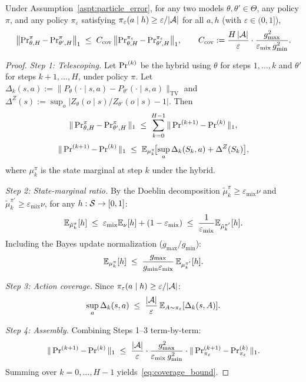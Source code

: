 \begin{lem}\label{lem:coverage}
Under Assumption~\ref{aspt:particle_error}, for any two models $\theta,\theta'\in\Theta$, any policy $\pi$, and any policy $\pi_\varepsilon$ satisfying $\pi_\varepsilon(a\mid h)\ge\varepsilon/|{\mathcal{A}}|$ for all $a,h$ (with $\varepsilon\in(0,1]$),
\begin{equation}\label{eq:coverage_bound}
\bigl\|\operatorname{Pr}_{\theta,H}^\pi-\operatorname{Pr}_{\theta',H}^\pi\bigr\|_1
\;\le\;
C_{\mathrm{cov}}\,
\bigl\|\operatorname{Pr}_{\theta,H}^{\pi_\varepsilon}-\operatorname{Pr}_{\theta',H}^{\pi_\varepsilon}\bigr\|_1,
\qquad
C_{\mathrm{cov}}:=\frac{H\,|{\mathcal{A}}|}{\varepsilon}\cdot\frac{g_{\max}^2}{\varepsilon_{\mathrm{mix}}\,g_{\min}^2}.
\end{equation}
\end{lem}

\begin{proof}
\emph{Step 1: Telescoping.}
Let $\operatorname{Pr}^{(k)}$ be the hybrid using $\theta$ for steps $1,\ldots,k$ and $\theta'$ for steps $k+1,\ldots,H$, under policy $\pi$. Let $\Delta_k(s,a):=\|P_\theta(\cdot\mid s,a)-P_{\theta'}(\cdot\mid s,a)\|_{\mathrm{TV}}$ and $\Delta^Z(s):=\sup_o|Z_\theta(o\mid s)/Z_{\theta'}(o\mid s)-1|$. Then
\begin{equation}\label{eq:telescope}
\|\operatorname{Pr}_{\theta,H}^\pi-\operatorname{Pr}_{\theta',H}^\pi\|_1
\;\le\;
\sum_{k=0}^{H-1}\|\operatorname{Pr}^{(k+1)}-\operatorname{Pr}^{(k)}\|_1,
\end{equation}
\begin{equation}\label{eq:per_step_bound}
\|\operatorname{Pr}^{(k+1)}-\operatorname{Pr}^{(k)}\|_1
\;\le\;
\mathbb{E}_{\mu_k^\pi}\!\bigl[\sup_{a}\Delta_k(S_k,a)+\Delta^Z(S_k)\bigr],
\end{equation}
where $\mu_k^\pi$ is the state marginal at step $k$ under the hybrid.

\emph{Step 2: State-marginal ratio.}
By the Doeblin decomposition $\tilde\mu_k^\pi \ge \varepsilon_{\mathrm{mix}}\nu$ and $\tilde\mu_k^{\pi'}\ge\varepsilon_{\mathrm{mix}}\nu$, for any $h:{\mathcal{S}}\to[0,1]$:
\[
\mathbb{E}_{\tilde\mu_k^\pi}[h]
\;\le\; \varepsilon_{\mathrm{mix}}\mathbb{E}_\nu[h] + (1-\varepsilon_{\mathrm{mix}})
\;\le\; \frac{1}{\varepsilon_{\mathrm{mix}}}\mathbb{E}_{\tilde\mu_k^{\pi'}}[h].
\]
Including the Bayes update normalization ($g_{\max}/g_{\min}$):
\[
\mathbb{E}_{\mu_k^\pi}[h]\;\le\; \frac{g_{\max}}{g_{\min}\varepsilon_{\mathrm{mix}}}\,\mathbb{E}_{\mu_k^{\pi'}}[h].
\]

\emph{Step 3: Action coverage.}
Since $\pi_\varepsilon(a\mid h)\ge\varepsilon/|{\mathcal{A}}|$:
\[
\sup_{a}\Delta_k(s,a)
\;\le\;
\frac{|{\mathcal{A}}|}{\varepsilon}\,\mathbb{E}_{A\sim\pi_\varepsilon}[\Delta_k(s,A)].
\]

\emph{Step 4: Assembly.}
Combining Steps 1--3 term-by-term:
\[
\|\operatorname{Pr}^{(k+1)}-\operatorname{Pr}^{(k)}\|_1
\;\le\;
\frac{|{\mathcal{A}}|}{\varepsilon}\cdot\frac{g_{\max}^2}{\varepsilon_{\mathrm{mix}}\,g_{\min}^2}\cdot\|\operatorname{Pr}^{(k+1)}_{\pi_\varepsilon}-\operatorname{Pr}^{(k)}_{\pi_\varepsilon}\|_1.
\]
Summing over $k=0,\ldots,H-1$ yields~\eqref{eq:coverage_bound}.\qedhere
\end{proof}
 
